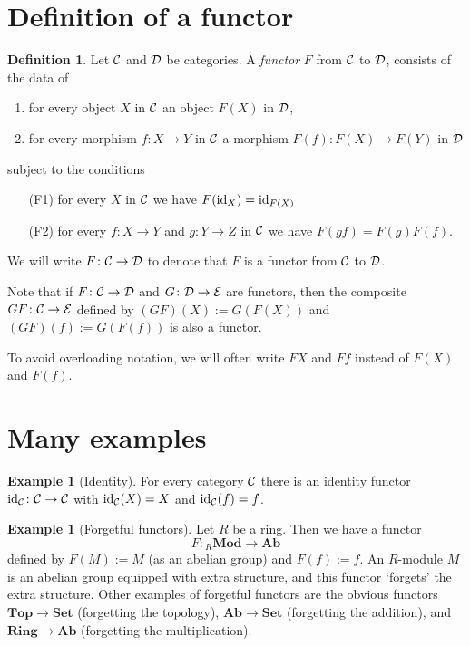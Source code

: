 \documentclass[11pt]{amsbook}
\DeclareMathOperator\Mod{{\bf{Mod}}}
\def\cE{{\mathcal{E}}} \def\cG{{\mathcal{G}}} \def\cH{{\mathcal{H}}}
\def\id{{\rm id}}
\def\Set{\mathbf{Set}}
\def\Ab{\mathbf{Ab}}
\def\Top{\mathbf{Top}}
\def\Ring{\mathbf{Ring}}
\def\Mod{\mathbf{Mod}}
\theoremstyle{plain}
\theoremstyle{definition}
\newtheorem{definition}[theorem]{Definition}
\newtheorem{example}[theorem]{Example}
\begin{document}
\section{Definition of a functor}

\begin{definition} Let ${\mathcal{C}}$ and ${\mathcal{D}}$ be categories. A \emph{functor} $F$ from ${\mathcal{C}}$ to ${\mathcal{D}}$, consists of the data of
\begin{enumerate}
\item for every object $X$ in ${\mathcal{C}}$ an object $F(X)$ in ${\mathcal{D}}$,
\item for every morphism $f\colon X\to Y$ in ${\mathcal{C}}$ a morphism $F(f)\colon F(X) \to F(Y)$ in ${\mathcal{D}}$
\end{enumerate}
subject to the conditions
\begin{enumerate}
\item[(F1)] for every $X$ in ${\mathcal{C}}$ we have $F(\id_X) = \id_{F(X)}$
\item[(F2)] for every $f\colon X\to Y$ and $g\colon Y\to Z$ in ${\mathcal{C}}$ we have $F(gf)=F(g)F(f)$.
\end{enumerate}
\end{definition}

We will  write $F\colon {\mathcal{C}}\to {\mathcal{D}}$ to denote that $F$ is a functor from ${\mathcal{C}}$ to ${\mathcal{D}}$.

Note that if $F\colon {\mathcal{C}}\to {\mathcal{D}}$ and $G\colon \cD \to \cE$ are functors, then  the composite $GF\colon \cC \to \cE$ defined by $(GF)(X) := G(F(X))$ and $(GF)(f) := G(F(f))$ is also a functor. 

To avoid overloading notation, we will often write $FX$ and $Ff$ instead of $F(X)$ and $F(f)$.

\section{Many examples}

\begin{example}[Identity]
For every category ${\mathcal{C}}$  there is an identity functor
$\id_\cC \colon \cC \to \cC$ with $\id_\cC(X) = X$ and $\id_\cC(f)= f$. 
\end{example}

\begin{example}[Forgetful functors]\label{exa:forgetful}
Let $R$ be a ring. Then we have a functor
\[
	F\colon {}_R\Mod \to \Ab
\]
defined by $F(M):=M$ (as an abelian group) and $F(f):=f$. 
An $R$-module $M$ is an abelian group equipped with extra structure, and this functor `forgets' the extra structure. Other examples of forgetful functors are the obvious functors $\Top \to \Set$ (forgetting the topology), $\Ab \to \Set$ (forgetting the addition), and $\Ring \to \Ab$ (forgetting the multiplication).
\end{example}
 
\end{document}
